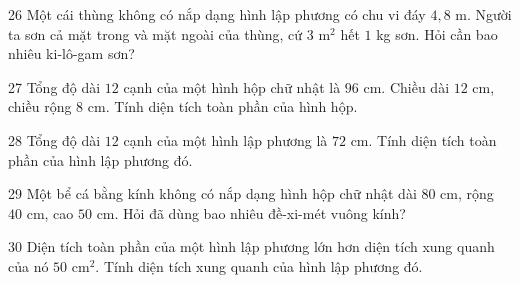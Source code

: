 \gap
\begin{probbox}{26}{\relax}
Một cái thùng không có nắp dạng hình lập phương có chu vi đáy $4{,}8$ m. Người ta sơn cả mặt trong và mặt ngoài của thùng, cứ $3$ m$^2$ hết $1$ kg sơn. Hỏi cần bao nhiêu ki-lô-gam sơn?
\end{probbox}
\gap
\begin{probbox}{27}{\relax}
Tổng độ dài $12$ cạnh của một hình hộp chữ nhật là $96$ cm. Chiều dài $12$ cm, chiều rộng $8$ cm. Tính diện tích toàn phần của hình hộp.
\end{probbox}
\gap
\begin{probbox}{28}{\relax}
Tổng độ dài $12$ cạnh của một hình lập phương là $72$ cm. Tính diện tích toàn phần của hình lập phương đó.
\end{probbox}
\gap
\begin{probbox}{29}{\relax}
Một bể cá bằng kính không có nắp dạng hình hộp chữ nhật dài $80$ cm, rộng $40$ cm, cao $50$ cm. Hỏi đã dùng bao nhiêu đề-xi-mét vuông kính?
\end{probbox}
\gap
\begin{probbox}{30}{\relax}
Diện tích toàn phần của một hình lập phương lớn hơn diện tích xung quanh của nó $50$ cm$^2$. Tính diện tích xung quanh của hình lập phương đó.
\end{probbox}
